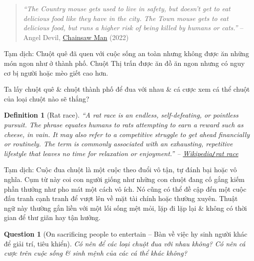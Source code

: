 \documentclass[12pt,twoside]{book}
\newtheorem{definition}{Definition}[section]
\newtheorem{question}{Question}
\begin{document}
\begin{quotation}
	{\it``The Country mouse gets used to live in safety, but doesn't get to eat delicious food like they have in the city. The Town mouse gets to eat delicious food, but runs a higher risk of being killed by humans or cats.''} -- {\sc Angel Devil}, \href{https://www.imdb.com/title/tt13616990/}{Chainsaw Man} (2022)
\end{quotation}
{\sf Tạm dịch}: Chuột quê đã quen với cuộc sống an toàn nhưng không được ăn những món ngon như ở thành phố. Chuột Thị trấn được ăn đồ ăn ngon nhưng có nguy cơ bị người hoặc mèo giết cao hơn.

Ta lấy chuột quê \& chuột thành phố để đua với nhau \& cá cược xem cá thể chuột của loại chuột nào sẽ thắng?

\begin{definition}[Rat race]
	``A \emph{rat race} is an endless, self-defeating, or pointless pursuit. The phrase equates humans to rats attempting to earn a reward such as cheese, in vain. It may also refer to a competitive struggle to get ahead financially or routinely. The term is commonly associated with an exhausting, repetitive lifestyle that leaves no time for relaxation or enjoyment.'' -- \href{https://en.wikipedia.org/wiki/Rat_race}{Wikipedia{\tt/}rat race}
\end{definition}
{\sf Tạm dịch}: Cuộc đua chuột là một cuộc theo đuổi vô tận, tự đánh bại hoặc vô nghĩa. Cụm từ này coi con người giống như những con chuột đang cố gắng kiếm phần thưởng như pho mát một cách vô ích. Nó cũng có thể đề cập đến một cuộc đấu tranh cạnh tranh để vượt lên về mặt tài chính hoặc thường xuyên. Thuật ngữ này thường gắn liền với một lối sống mệt mỏi, lặp đi lặp lại \& không có thời gian để thư giãn hay tận hưởng.

\begin{question}[On sacrificing people to entertain -- Bàn về việc hy sinh người khác để giải trí, tiêu khiển]
	Có nên để các loại chuột đua với nhau không? Có nên cá cược trên cuộc sống \& sinh mệnh của các cá thể khác không?
\end{question}
\end{document}
